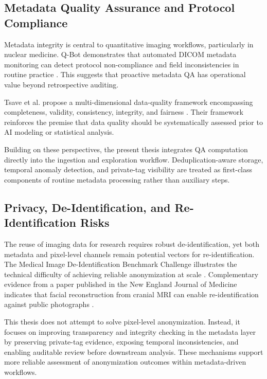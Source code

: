 \subsection{Metadata Quality Assurance and Protocol Compliance}

Metadata integrity is central to quantitative imaging workflows, particularly in nuclear medicine. Q-Bot demonstrates that automated DICOM metadata monitoring can detect protocol non-compliance and field inconsistencies in routine practice \cite{nagy_qbot}. This suggests that proactive metadata QA has operational value beyond retrospective auditing.

Tsave et al. propose a multi-dimensional data-quality framework encompassing completeness, validity, consistency, integrity, and fairness \cite{cancers17193213}. Their framework reinforces the premise that data quality should be systematically assessed prior to AI modeling or statistical analysis.

Building on these perspectives, the present thesis integrates QA computation directly into the ingestion and exploration workflow. Deduplication-aware storage, temporal anomaly detection, and private-tag visibility are treated as first-class components of routine metadata processing rather than auxiliary steps.

\subsection{Privacy, De-Identification, and Re-Identification Risks}

The reuse of imaging data for research requires robust de-identification, yet both metadata and pixel-level channels remain potential vectors for re-identification. The Medical Image De-Identification Benchmark Challenge illustrates the technical difficulty of achieving reliable anonymization at scale \cite{pei2025medicalimagedeidentificationbenchmark}. Complementary evidence from a paper published in the New England Journal of Medicine indicates that facial reconstruction from cranial MRI can enable re-identification against public photographs \cite{anonrisk}.

This thesis does not attempt to solve pixel-level anonymization. Instead, it focuses on improving transparency and integrity checking in the metadata layer by preserving private-tag evidence, exposing temporal inconsistencies, and enabling auditable review before downstream analysis. These mechanisms support more reliable assessment of anonymization outcomes within metadata-driven workflows.
